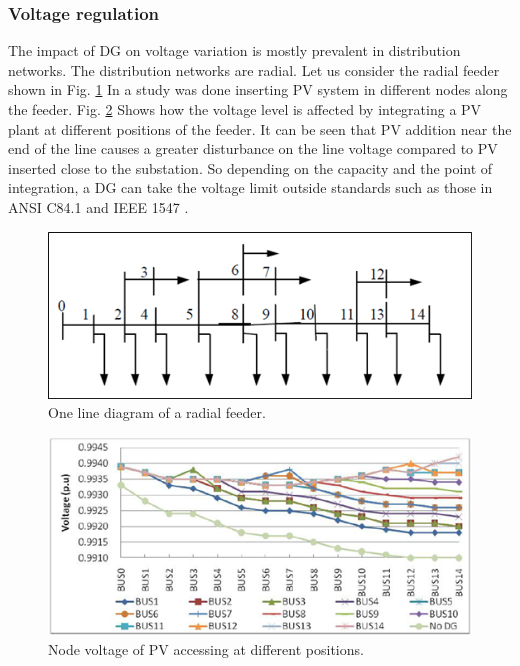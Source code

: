 \subsubsection{Voltage regulation}
The impact of DG on voltage variation is mostly prevalent in distribution networks. The distribution networks are radial. Let us consider the radial feeder shown in 
Fig. \ref{fig:VR1} In \cite{VR1} a study was done inserting PV system in different nodes along the feeder. Fig. \ref{fig:VR2} Shows how the voltage level is affected by integrating a PV plant at different positions of the feeder. It can be seen that PV addition near the end of the line causes a greater disturbance on the line voltage compared to PV inserted close to the substation. So depending on the capacity and the point of integration, a DG can take the voltage limit outside standards such as those in ANSI C84.1 and IEEE 1547 \cite{VR2}. 

\begin{figure}[!h]
\centering
\includegraphics[width=0.85\linewidth]{figs/VR1.png}
\caption[One line diagram of a radial feeder]{One line diagram of a radial feeder.\cite{VR1}}
\label{fig:VR1}
\end{figure}

\begin{figure}[!h]
\centering
\includegraphics[width=0.85\linewidth]{figs/VR2.png}
\caption[Node voltage of PV accessing at different positions]{Node voltage of PV accessing at different positions.\cite{VR1}}
\label{fig:VR2}
\end{figure}

